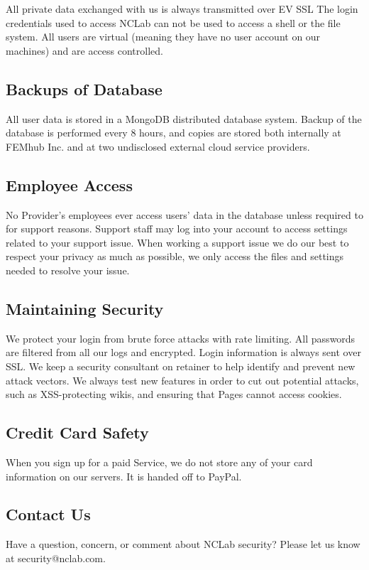 \documentclass{article}
\begin{document}
All private data exchanged with us is always transmitted over EV SSL
The login credentials used to access NCLab can not be used to access a shell or the file system. All users are virtual (meaning they have no user account on our machines) and are access controlled.


\subsection*{Backups of Database}

All user data is stored in a MongoDB distributed database system. Backup of the database is performed every 8 hours, and copies are stored both internally at FEMhub Inc. and at two undisclosed external cloud service providers. 


\subsection*{Employee Access}

No Provider’s employees ever access users’ data in the database unless required to for support reasons. Support staff may log into your account to access settings related to your support issue. When working a support issue we do our best to respect your privacy as much as possible, we only access the files and settings needed to resolve your issue.


\subsection*{Maintaining Security}

We protect your login from brute force attacks with rate limiting. All passwords are filtered from all our logs and encrypted. Login information is always sent over SSL.
We keep a security consultant on retainer to help identify and prevent new attack vectors. We always test new features in order to cut out potential attacks, such as XSS-protecting wikis, and ensuring that Pages cannot access cookies.


\subsection*{Credit Card Safety}

When you sign up for a paid Service, we do not store any of your card information on our servers. It is handed off to PayPal.


\subsection*{Contact Us}

Have a question, concern, or comment about NCLab security? Please let us know at security@nclab.com.
\end{document}
